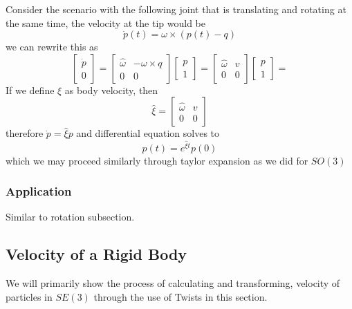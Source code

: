 \documentclass[letterpaper]{article}
\begin{document}
Consider the scenario with the following joint that is translating and
rotating at the same time, the velocity at the tip would be
\begin{equation*}
    \dot{p}(t) = \omega \times (p(t) - q)
\end{equation*}
we can rewrite this as
\begin{equation*}
  \begin{bmatrix}
    \dot{p} \\ 0
  \end{bmatrix} = 
  \begin{bmatrix}
    \widehat{\omega} & -\omega \times q \\ 0 & 0
  \end{bmatrix}
  \begin{bmatrix}
    p \\ 1  
  \end{bmatrix} = 
  \begin{bmatrix}
    \widehat{\omega} & v \\ 0 & 0
  \end{bmatrix}
  \begin{bmatrix}
    p \\ 1  
  \end{bmatrix} = 
\end{equation*}
If we define $\xi$ as body velocity, then
\begin{equation*}
  \widehat{\xi} = \begin{bmatrix}
    \widehat{\omega} & v \\ 0 & 0
  \end{bmatrix}
\end{equation*}
therefore $\dot{p} = \widehat{\xi} p$ and differential equation solves to
\begin{equation*}
  p(t) = e^{\widehat{\xi}t}p(0)
\end{equation*}
which we may proceed similarly through taylor expansion as we did for $SO(3)$

\subsubsection{Application}
Similar to rotation subsection. 

\subsection{Velocity of a Rigid Body}
We will primarily show the process of calculating and transforming, 
velocity of particles in $SE(3)$ through the use of Twists in this section.
\end{document}
